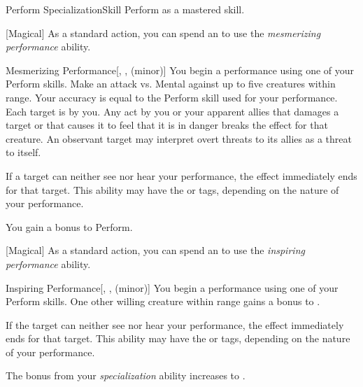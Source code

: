     \begin{feat}{Perform Specialization}{Skill}
        \featpre Perform as a mastered skill.

        [Magical] As a standard action, you can spend an  to use the \textit{mesmerizing performance} ability.
        \begin{ability}{Mesmerizing Performance}[, ,  (minor)]
            You begin a performance using one of your Perform skills.
            Make an attack vs. Mental against up to five creatures within \rngmed range.
            Your accuracy is equal to the Perform skill used for your performance.
            \hit Each target is \fascinated by you.
            Any act by you or your apparent allies that damages a target or that causes it to feel that it is in danger breaks the effect for that creature.
            An observant target may interpret overt threats to its allies as a threat to itself.

            If a target can neither see nor hear your performance, the effect immediately ends for that target.
            This ability may have the  or  tags, depending on the nature of your performance.
        \end{ability}

         You gain a  bonus to Perform.

        [Magical] As a standard action, you can spend an  to use the \textit{inspiring performance} ability.
        \begin{ability}{Inspiring Performance}[, ,  (minor)]
            You begin a performance using one of your Perform skills.
            One other willing creature within \rngmed range gains a  bonus to .

            If the target can neither see nor hear your performance, the effect immediately ends for that target.
            This ability may have the  or  tags, depending on the nature of your performance.
        \end{ability}

         The bonus from your \textit{specialization} ability increases to .


\end{feat}
